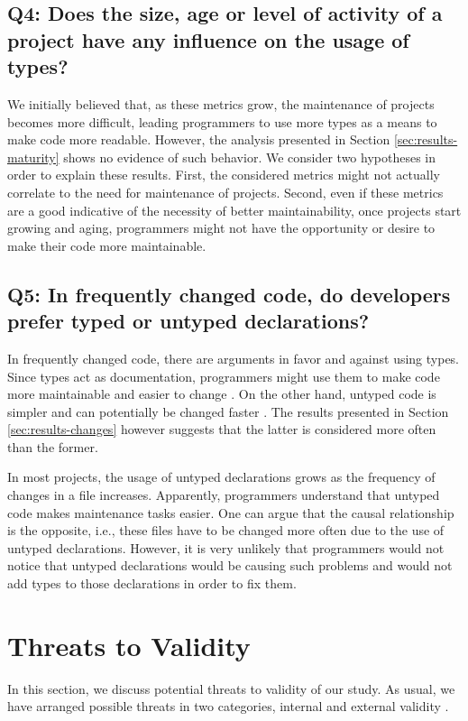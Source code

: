 \documentclass[msc]{ppgccufmg}
\begin{document}
\section*{Q4: Does the size, age or level of activity  of a project have any influence on the usage of types?\label{discussion-q4}}
We initially believed that, as these metrics grow, the maintenance of projects becomes more difficult, leading programmers to use more types as a means to make code more readable.
However, the analysis presented in Section \ref{sec:results-maturity} shows no evidence of such behavior.
We consider two hypotheses in order to explain these results.
First, the considered metrics might not actually correlate to the need for maintenance of projects.
Second, even if these metrics are a good indicative of the necessity of better maintainability, once projects start growing and aging, programmers might not have the opportunity or desire to make their code more maintainable.

\section*{Q5: In frequently changed code, do developers prefer typed or untyped declarations?\label{discussion-q5}}
In frequently changed code, there are arguments in favor and against using types.
Since types act as documentation, programmers might use them to make code more maintainable and easier to change  \cite{should_your_specification_language_be_typed}.
On the other hand, untyped code is simpler and can potentially be changed faster \cite{gradual_typing}.
The results presented in Section \ref{sec:results-changes} however suggests that the latter is considered more often than the former.

In most projects, the usage of untyped declarations grows as the frequency of changes in a file increases.
Apparently, programmers understand that untyped code makes maintenance tasks easier.
One can argue that the causal relationship is the opposite, i.e., these files have to be changed more often due to the use of untyped declarations.
However, it is very unlikely that programmers would not notice that untyped declarations would be causing such problems and would not add types to those declarations in order to fix them.










%
%
\chapter{Threats to Validity\label{threats}}
In this section, we discuss potential threats to validity of our study. As usual, we have arranged possible threats in two categories, internal and external validity \cite{Wohlin2012}. 
\end{document}
